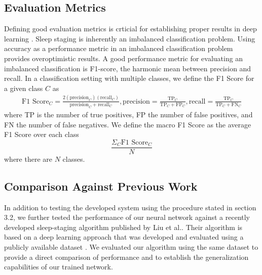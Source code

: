 \documentclass[pdflatex,sn-mathphys-num]{sn-jnl}%
\theoremstyle{thmstyleone}%
\theoremstyle{thmstyletwo}%
\theoremstyle{thmstylethree}%
\begin{document}
\subsection*{Evaluation Metrics}
Defining good evaluation metrics is crticial for establishing proper results in deep learning \cite{Goodfellow-et-al-2016}. Sleep staging is inherently an imbalanced classification problem. Using accuracy as a performance metric in an imbalanced classification problem provides overoptimistic results. A good performance metric for evaluating an imbalanced classification is F1-score, the harmonic mean between precision and recall. In a classification setting with multiple classes, we define the F1 Score for a given class $C$ as
\begin{gather*}
\text{F1 Score}_C = \frac{2 (\text{precision}_C)(\text{recall}_C)}{\text{precision}_C + \text{recall}_C},
\text{precision} = \frac{\text{TP}_C}{\text{TP}_C+\text{FP}_C},\text{recall} = \frac{\text{TP}_C}{\text{TP}_C+\text{FN}_C}
\end{gather*}
where TP is the number of true positives, FP the number of false positives, and FN the number of false negatives. We define the macro F1 Score as the average F1 Score over each class
$$
\frac{\Sigma_C \text{F1 Score}_C}{N}
$$
where there are $N$ classes.
\subsection*{Comparison Against Previous Work}
In addition to testing the developed system using the procedure stated in section 3.2, we further tested the performance of our neural network against a recently developed sleep-staging algorithm published by Liu et al.\cite{liu_attention-based_2022}. Their algorithm is based on a deep learning approach that was developed and evaluated using a publicly available dataset \cite{miladinovic_spindle_2019}. We evaluated our algorithm using the same dataset to provide a direct comparison of performance and to establish the generalization capabilities of our trained network.
\end{document}
